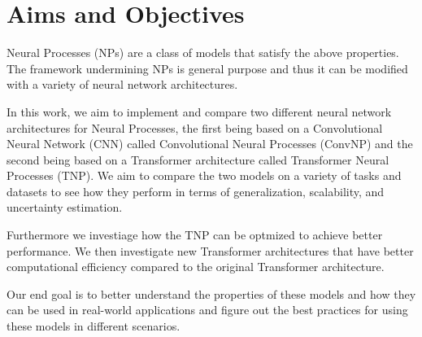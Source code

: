 \documentclass[../../main.tex]{subfiles}
\begin{document}

\section{Aims and Objectives}

Neural Processes (NPs) \cite{garnelo2018neural} are a class of models that satisfy the above properties. The framework undermining NPs is general purpose and thus it can be modified with a variety of neural network architectures. 

In this work, we aim to implement and compare two different neural network architectures for Neural Processes, the first being based on a Convolutional Neural Network (CNN) called Convolutional Neural Processes (ConvNP) and the second being based on a Transformer architecture called Transformer Neural Processes (TNP). We aim to compare the two models on a variety of tasks and datasets to see how they perform in terms of generalization, scalability, and uncertainty estimation. 

Furthermore we investiage how the TNP can be optmized to achieve better performance. We then investigate new Transformer architectures that have better computational efficiency compared to the original Transformer architecture. 

Our end goal is to better understand the properties of these models and how they can be used in real-world applications and figure out the best practices for using these models in different scenarios. 





\ifSubfilesClassLoaded{%
    \printbibliography{}
}{} 
\end{document}
